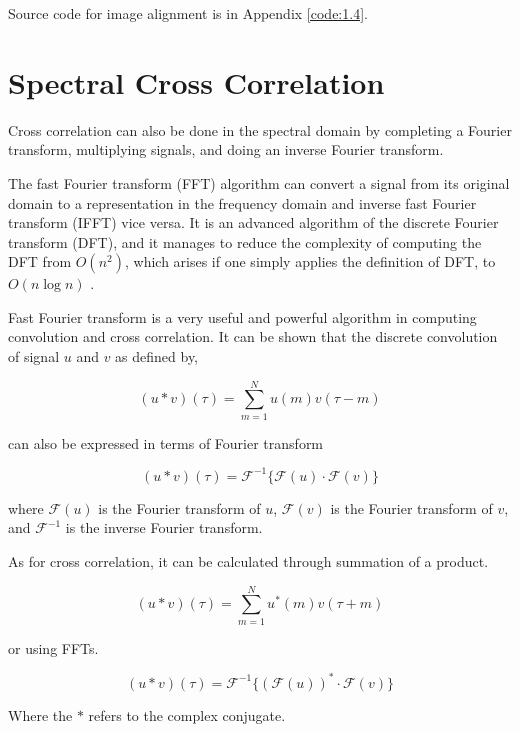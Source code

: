 Source code for image alignment is in Appendix \ref{code:1.4}.

\section{Spectral Cross Correlation}

Cross correlation can also be done in the spectral domain by completing a Fourier transform, multiplying signals, and doing an inverse Fourier transform.

The fast Fourier transform (FFT) algorithm can convert a signal from its original domain to a representation in the frequency domain and inverse fast Fourier transform (IFFT) vice versa. It is an advanced algorithm of the discrete Fourier transform (DFT), and it manages to reduce the complexity of computing the DFT from $O(n^2)$, which arises if one simply applies the definition of DFT, to $O(n\log n)$ \cite{heiderman84}.

Fast Fourier transform is a very useful and powerful algorithm in computing convolution and cross correlation. It can be shown that the discrete convolution of signal $u$ and $v$ as defined by,

\begin{equation*}
(u*v)(\tau)=\sum_{m=1}^{N}u(m)v(\tau-m)
\end{equation*}

can also be expressed in terms of Fourier transform

\begin{equation*}
(u*v)(\tau)=\mathcal{F}^{-1}\{\mathcal{F}(u)\cdot \mathcal{F}(v)\}
\end{equation*}

where $\mathcal{F}(u)$ is the Fourier transform of $u$, $\mathcal{F}(v)$ is the Fourier transform of $v$, and $\mathcal{F}^{-1}$ is the inverse Fourier transform.

As for cross correlation, it can be calculated through summation of a product.

\begin{equation*}
(u*v)(\tau)=\sum_{m=1}^{N}u^*(m)v(\tau+m)
\end{equation*}

or using FFTs.

\begin{equation*}
	(u*v)(\tau)=\mathcal{F}^{-1}\{(\mathcal{F}(u))^{*}\cdot \mathcal{F}(v)\}
\end{equation*}

Where the $*$ refers to the complex conjugate.


